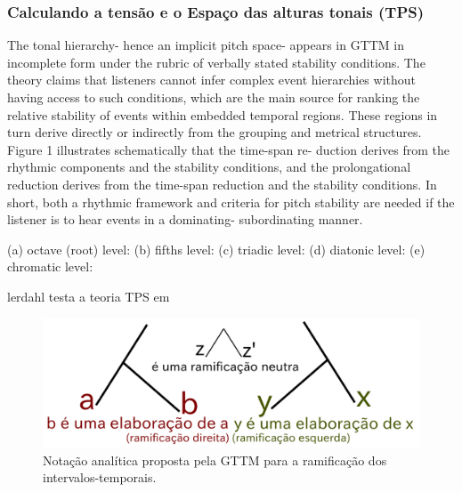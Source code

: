 \documentclass[
	12pt,				%
	openright,			%
	twoside,			%
	a4paper,			%
	english,			%
	french,				%
	spanish,			%
	brazil				%
	]{abntex2}
\begin{document}
\subsubsection{Calculando a tensão e o Espaço das alturas tonais (TPS) }



\begin{citacao}
The tonal hierarchy- hence an implicit pitch space- appears in GTTM
in incomplete form under the rubric of verbally stated stability conditions.
The theory claims that listeners cannot infer complex event hierarchies
without having access to such conditions, which are the main source for
ranking the relative stability of events within embedded temporal regions.
These regions in turn derive directly or indirectly from the grouping and
metrical structures. Figure 1 illustrates schematically that the time-span re-
duction derives from the rhythmic components and the stability conditions,
and the prolongational reduction derives from the time-span reduction and
the stability conditions. In short, both a rhythmic framework and criteria
for pitch stability are needed if the listener is to hear events in a dominating-
subordinating manner.\cite{lerdahl1988tps}
\end{citacao}

(a) octave (root) level:
(b) fifths level:
(c) triadic level:
(d) diatonic level:
(e) chromatic level:


lerdahl testa a teoria TPS em \cite{2007lerdahl-krumhansl}




\begin{figure}[htb]
	\caption{\label{fig_grafico}Notação analítica proposta pela GTTM para a ramificação dos intervalos-temporais.}
	\begin{center}
	    \includegraphics[scale=0.5]{gttm/ramificacoes_arvore.pdf}
	\end{center}
\end{figure}
\end{document}
